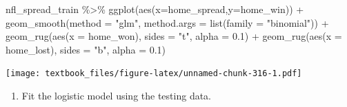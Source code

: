 \documentclass[
  11pt,
]{book}
\newenvironment{Shaded}{\begin{snugshade}}{\end{snugshade}}
\newcommand{\AttributeTok}[1]{\textcolor[rgb]{0.77,0.63,0.00}{#1}}
\newcommand{\FloatTok}[1]{\textcolor[rgb]{0.00,0.00,0.81}{#1}}
\newcommand{\FunctionTok}[1]{\textcolor[rgb]{0.00,0.00,0.00}{#1}}
\newcommand{\NormalTok}[1]{#1}
\newcommand{\SpecialCharTok}[1]{\textcolor[rgb]{0.00,0.00,0.00}{#1}}
\newcommand{\StringTok}[1]{\textcolor[rgb]{0.31,0.60,0.02}{#1}}
\providecommand{\tightlist}{%
  \setlength{\itemsep}{0pt}\setlength{\parskip}{0pt}}
\theoremstyle{definition}
\theoremstyle{definition}
\theoremstyle{definition}
\theoremstyle{definition}
\theoremstyle{remark}
\begin{document}
\begin{Shaded}
\begin{Highlighting}[]
\NormalTok{nfl\_spread\_train }\SpecialCharTok{\%\textgreater{}\%} \FunctionTok{ggplot}\NormalTok{(}\FunctionTok{aes}\NormalTok{(}\AttributeTok{x=}\NormalTok{home\_spread,}\AttributeTok{y=}\NormalTok{home\_win)) }\SpecialCharTok{+}
  \FunctionTok{geom\_smooth}\NormalTok{(}\AttributeTok{method =} \StringTok{"glm"}\NormalTok{, }
    \AttributeTok{method.args =} \FunctionTok{list}\NormalTok{(}\AttributeTok{family =} \StringTok{"binomial"}\NormalTok{)) }\SpecialCharTok{+} 
  \FunctionTok{geom\_rug}\NormalTok{(}\FunctionTok{aes}\NormalTok{(}\AttributeTok{x =}\NormalTok{ home\_won), }\AttributeTok{sides =} \StringTok{"t"}\NormalTok{, }\AttributeTok{alpha =} \FloatTok{0.1}\NormalTok{) }\SpecialCharTok{+}
  \FunctionTok{geom\_rug}\NormalTok{(}\FunctionTok{aes}\NormalTok{(}\AttributeTok{x =}\NormalTok{ home\_lost), }\AttributeTok{sides =} \StringTok{"b"}\NormalTok{, }\AttributeTok{alpha =} \FloatTok{0.1}\NormalTok{)}
\end{Highlighting}
\end{Shaded}

\texttt{[image: textbook\_files/figure-latex/unnamed-chunk-316-1.pdf]}

\newpage

\begin{enumerate}
\def\labelenumi{(\alph{enumi})}
\setcounter{enumi}{2}
\tightlist
\item
  Fit the logistic model using the testing data.
\end{enumerate}
\end{document}
